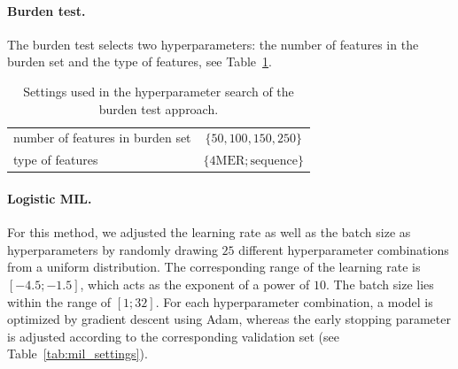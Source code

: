 \documentclass[oneside]{book}
\begin{document}
\paragraph{Burden test.}
The burden test selects two hyperparameters: the number of features
in the burden set and the type of features, see Table~\ref{tab:burden_settings}.

\begin{table}[htp]%
    \begin{center}%
        \begin{tabular}{lc}%
            \toprule
            number of features in burden set & $\{50,100,150,250\}$ \\
            type of features & $\{\mathrm{4MER}; \mathrm{sequence}\}$ \\
            \bottomrule
        \end{tabular}%
        \caption[Hyperparameter search of the burden test]{Settings used in the hyperparameter search of the burden test approach.}%
        \label{tab:burden_settings}%
    \end{center}%
\end{table}


\paragraph{Logistic MIL.}
For this method, we adjusted the learning rate as well as the batch size as 
hyperparameters by randomly drawing $25$ different hyperparameter 
combinations from a uniform distribution. The corresponding 
range of the learning rate is $[-4.5; -1.5]$, which
acts as the exponent of a power of $10$. The batch size lies 
within the range of $[1; 32]$. For each hyperparameter 
combination, a model is optimized by gradient descent using
Adam, whereas the early stopping parameter is adjusted 
according to the corresponding validation set (see Table~\ref{tab:mil_settings}).
\end{document}
